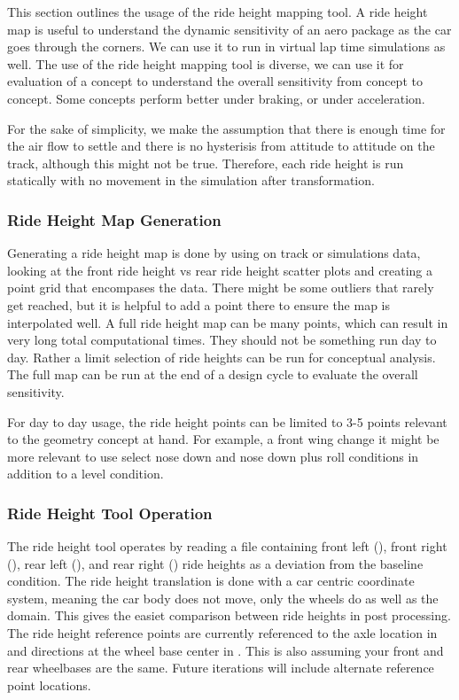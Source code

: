 This section outlines the usage of the ride height mapping tool. A ride height map is useful to understand the dynamic sensitivity of an aero package as the car goes through the corners. We can use it to run in virtual lap time simulations as well. The use of the ride height mapping tool is diverse, we can use it for evaluation of a concept to understand the overall sensitivity from concept to concept. Some concepts perform better under braking, or under acceleration.

For the sake of simplicity, we make the assumption that there is enough time for the air flow to settle and there is no hysterisis from attitude to attitude on the track, although this might not be true. Therefore, each ride height is run statically with no movement in the simulation after transformation. 

\subsubsection{Ride Height Map Generation}
Generating a ride height map is done by using on track or simulations data, looking at the front ride height vs rear ride height scatter plots and creating a point grid that encompases the data. There might be some outliers that rarely get reached, but it is helpful to add a point there to ensure the map is interpolated well. A full ride height map can be many points, which can result in very long total computational times. They should not be something run day to day. Rather a limit selection of ride heights can be run for conceptual analysis. The full map can be run at the end of a design cycle to evaluate the overall sensitivity. 

For day to day usage, the ride height points can be limited to 3-5 points relevant to the geometry concept at hand. For example, a front wing change it might be more relevant to use select nose down and nose down plus roll conditions in addition to a level condition. 

\subsubsection{Ride Height Tool Operation}
The ride height tool operates by reading a  file containing front left (), front right (),  rear left (), and rear right () ride heights as a deviation from the baseline condition. The ride height translation is done with a car centric coordinate system, meaning the car body does not move, only the wheels do as well as the domain. This gives the easiet comparison between ride heights in post processing. The ride height reference points are currently referenced to the axle location in  and  directions at the wheel base center in . This is also assuming your front and rear wheelbases are the same. Future iterations will include alternate reference point locations.

